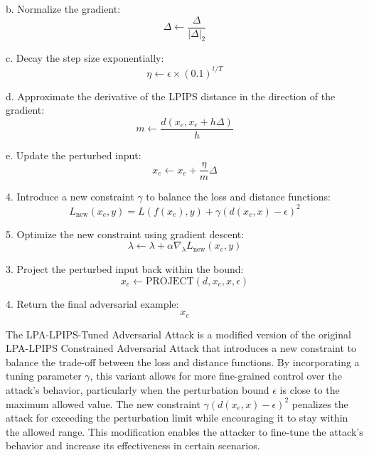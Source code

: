         b. Normalize the gradient:
           \[
           \Delta \leftarrow \frac{\Delta}{|\Delta|_2}
           \]
           
        c. Decay the step size exponentially:
           \[
           \eta \leftarrow \epsilon \times (0.1)^{t/T}
           \]
           
        d. Approximate the derivative of the LPIPS distance in the direction of the gradient:
           \[
           m \leftarrow \frac{d(x_e, x_e + h \Delta)}{h}
           \]
           
        e. Update the perturbed input:
           \[
           x_e \leftarrow x_e + \frac{\eta}{m} \Delta
           \]
           
    4. Introduce a new constraint $\gamma$ to balance the loss and distance functions:
       \[
       L_{\text{new}}(x_e, y) = L(f(x_e), y) + \gamma (d(x_e, x) - \epsilon)^2
       \]
       
    5. Optimize the new constraint using gradient descent:
       \[
       \lambda \leftarrow \lambda + \alpha \nabla_{\lambda} L_{\text{new}}(x_e, y)
       \]
       
3. Project the perturbed input back within the bound:
   \[
   x_e \leftarrow \text{PROJECT}(d, x_e, x, \epsilon)
   \]

4. Return the final adversarial example:
   \[
   x_e
   \]


The LPA-LPIPS-Tuned Adversarial Attack is a modified version of the original LPA-LPIPS Constrained Adversarial Attack that introduces a new constraint to balance the trade-off between the loss and distance functions. By incorporating a tuning parameter $\gamma$, this variant allows for more fine-grained control over the attack's behavior, particularly when the perturbation bound $\epsilon$ is close to the maximum allowed value. The new constraint $\gamma (d(x_e, x) - \epsilon)^2$ penalizes the attack for exceeding the perturbation limit while encouraging it to stay within the allowed range. This modification enables the attacker to fine-tune the attack's behavior and increase its effectiveness in certain scenarios.